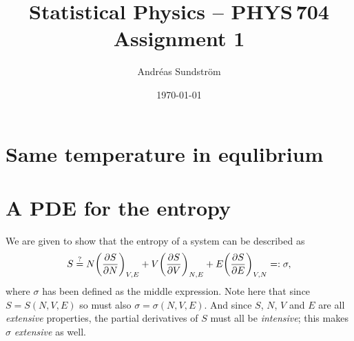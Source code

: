 \documentclass[11pt,letter, swedish, english
]{article}
\begin{document}
\title{Statistical Physics -- PHYS\,704 \\
Assignment 1}
\author{Andréas Sundström}
\date{\today}

\maketitle



\section{Same temperature in equlibrium}


\section{A PDE for the entropy}
We are given to show that the entropy of a system can be described as
\begin{equation}
S \stackrel{?}{=} N\qty(\pdv{S}{N})_{V,E} 
+ V\qty(\pdv{S}{V})_{N,E}
+ E\qty(\pdv{S}{E})_{V,N} =: \sigma,
\end{equation}
where $\sigma$ has been defined as the middle expression. Note here
that since $S=S(N, V, E)$ so must also $\sigma=\sigma(N, V, E)$. And
since $S$, $N$, $V$ and $E$ are all \emph{extensive} properties, the
partial derivatives of $S$ must all be \emph{intensive}; this
makes $\sigma$ \emph{extensive} as well. 
\end{document}
